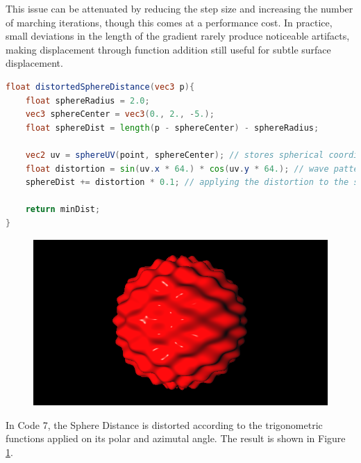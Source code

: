 This issue can be attenuated by reducing the step size and increasing the number of marching iterations, though this comes at a performance cost. In practice, small deviations in the length of the gradient rarely produce noticeable artifacts, making displacement through function addition still useful for subtle surface displacement.

\begin{lstlisting}[language=GLSL, caption={Code 7: Wave Distortion on Sphere}, label={lst:DistortionOnSphere} float=H]
float distortedSphereDistance(vec3 p){
    float sphereRadius = 2.0;
    vec3 sphereCenter = vec3(0., 2., -5.);
    float sphereDist = length(p - sphereCenter) - sphereRadius;

    vec2 uv = sphereUV(point, sphereCenter); // stores spherical coordinates angles on uv
    float distortion = sin(uv.x * 64.) * cos(uv.y * 64.); // wave pattern according to the uv
    sphereDist += distortion * 0.1; // applying the distortion to the sphere distance

    return minDist;
}
\end{lstlisting}


\begin{figure}[ht]
    \centering
  \includegraphics[width=.6\linewidth]{imagens/sdf-distortion/sin-cos-distortion.png}
  \label{fig:sin-cos-distortion}
\end{figure}

In Code 7, the Sphere Distance is distorted according to the trigonometric functions applied on its polar and azimutal angle. The result is shown in Figure \ref{fig:sin-cos-distortion}.